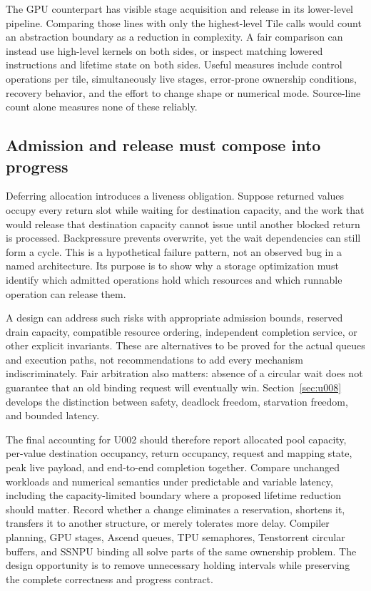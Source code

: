 The GPU counterpart has visible stage acquisition and release in its lower-level pipeline. Comparing those lines with only the highest-level Tile calls would count an abstraction boundary as a reduction in complexity. A fair comparison can instead use high-level kernels on both sides, or inspect matching lowered instructions and lifetime state on both sides. Useful measures include control operations per tile, simultaneously live stages, error-prone ownership conditions, recovery behavior, and the effort to change shape or numerical mode. Source-line count alone measures none of these reliably.

\subsection{Admission and release must compose into progress}

Deferring allocation introduces a liveness obligation. Suppose returned values occupy every return slot while waiting for destination capacity, and the work that would release that destination capacity cannot issue until another blocked return is processed. Backpressure prevents overwrite, yet the wait dependencies can still form a cycle. This is a hypothetical failure pattern, not an observed bug in a named architecture. Its purpose is to show why a storage optimization must identify which admitted operations hold which resources and which runnable operation can release them.

A design can address such risks with appropriate admission bounds, reserved drain capacity, compatible resource ordering, independent completion service, or other explicit invariants. These are alternatives to be proved for the actual queues and execution paths, not recommendations to add every mechanism indiscriminately. Fair arbitration also matters: absence of a circular wait does not guarantee that an old binding request will eventually win. Section~\ref{sec:u008} develops the distinction between safety, deadlock freedom, starvation freedom, and bounded latency.

The final accounting for U002 should therefore report allocated pool capacity, per-value destination occupancy, return occupancy, request and mapping state, peak live payload, and end-to-end completion together. Compare unchanged workloads and numerical semantics under predictable and variable latency, including the capacity-limited boundary where a proposed lifetime reduction should matter. Record whether a change eliminates a reservation, shortens it, transfers it to another structure, or merely tolerates more delay. Compiler planning, GPU stages, Ascend queues, TPU semaphores, Tenstorrent circular buffers, and SSNPU binding all solve parts of the same ownership problem. The design opportunity is to remove unnecessary holding intervals while preserving the complete correctness and progress contract.
